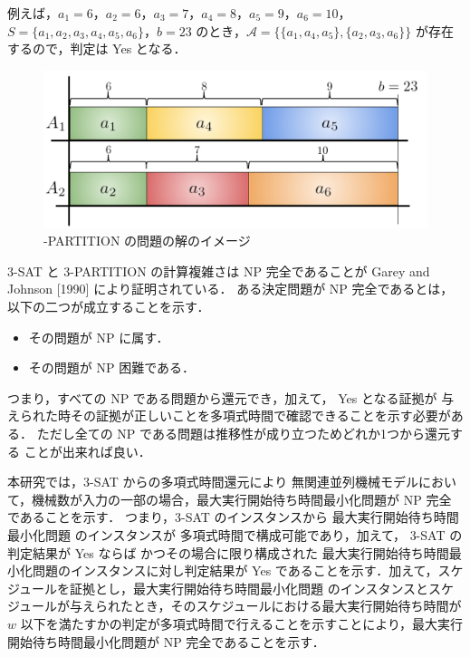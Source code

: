 \documentclass[12pt]{optlab-bachelor}
\begin{document}
例えば，$a_1 = 6$，$a_2 = 6$，$a_3 = 7$，$a_4 = 8$，$a_5 = 9$，$a_6 = 10$，$S = \{a_1, a_2, a_3, a_4, a_5, a_6\}$，$b = 23$ のとき，$\mathcal{A} = \big\{\{a_1, a_4, a_5\}, \{a_2, a_3, a_6\}\big\}$ が存在するので，判定は Yes となる．

\begin{figure}[h]
  \centering
  \includegraphics[width = 12cm]{figure/3-PARTITION.pdf}
  \caption{{-PARTITION} の問題の解のイメージ}
\end{figure}

\textsc{3-SAT} と \textsc{3-PARTITION} の計算複雑さは NP 完全であることが Garey and Johnson [1990] \cite{3SAT} により証明されている．
ある決定問題が NP 完全であるとは，以下の二つが成立することを示す．
\begin{itemize}
  \item その問題が NP に属す．
  \item その問題が NP 困難である．
\end{itemize}
つまり，すべての NP である問題から還元でき，加えて， Yes となる証拠が
与えられた時その証拠が正しいことを多項式時間で確認できることを示す必要がある．
ただし全ての NP である問題は推移性が成り立つためどれか1つから還元する
ことが出来れば良い．

本研究では，\textsc{3-SAT} からの多項式時間還元により 無関連並列機械モデルにおいて，機械数が入力の一部の場合，最大実行開始待ち時間最小化問題が NP 完全であることを示す．
つまり，\textsc{3-SAT} のインスタンスから 最大実行開始待ち時間最小化問題 のインスタンスが
多項式時間で構成可能であり，加えて， \textsc{3-SAT}  の判定結果が Yes ならば
かつその場合に限り構成された  最大実行開始待ち時間最小化問題のインスタンスに対し判定結果が Yes であることを示す．加えて，スケジュールを証拠とし，最大実行開始待ち時間最小化問題 のインスタンスとスケジュールが与えられたとき，そのスケジュールにおける最大実行開始待ち時間が $w$ 以下を満たすかの判定が多項式時間で行えることを示すことにより，最大実行開始待ち時間最小化問題が NP 完全であることを示す．
\end{document}
